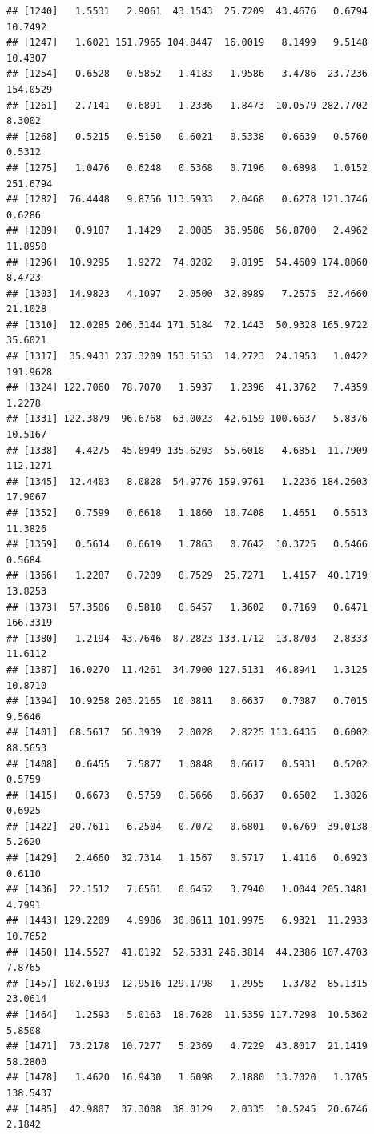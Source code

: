 \documentclass{article}\usepackage[]{graphicx}\usepackage[]{color}
\makeatletter
\newenvironment{kframe}{%
 \def\at@end@of@kframe{}%
 \ifinner\ifhmode%
  \def\at@end@of@kframe{\end{minipage}}%
  \begin{minipage}{\columnwidth}%
 \fi\fi%
 \def\FrameCommand##1{\hskip\@totalleftmargin \hskip-\fboxsep
 \colorbox{shadecolor}{##1}\hskip-\fboxsep
     \hskip-\linewidth \hskip-\@totalleftmargin \hskip\columnwidth}%
 \MakeFramed {\advance\hsize-\width
   \@totalleftmargin\z@ \linewidth\hsize
   \@setminipage}}%
 {\par\unskip\endMakeFramed%
 \at@end@of@kframe}
\newenvironment{knitrout}{}{} %
\makeatother
\begin{document}
\begin{knitrout}
\begin{kframe}
\begin{verbatim}
## [1240]   1.5531   2.9061  43.1543  25.7209  43.4676   0.6794  10.7492
## [1247]   1.6021 151.7965 104.8447  16.0019   8.1499   9.5148  10.4307
## [1254]   0.6528   0.5852   1.4183   1.9586   3.4786  23.7236 154.0529
## [1261]   2.7141   0.6891   1.2336   1.8473  10.0579 282.7702   8.3002
## [1268]   0.5215   0.5150   0.6021   0.5338   0.6639   0.5760   0.5312
## [1275]   1.0476   0.6248   0.5368   0.7196   0.6898   1.0152 251.6794
## [1282]  76.4448   9.8756 113.5933   2.0468   0.6278 121.3746   0.6286
## [1289]   0.9187   1.1429   2.0085  36.9586  56.8700   2.4962  11.8958
## [1296]  10.9295   1.9272  74.0282   9.8195  54.4609 174.8060   8.4723
## [1303]  14.9823   4.1097   2.0500  32.8989   7.2575  32.4660  21.1028
## [1310]  12.0285 206.3144 171.5184  72.1443  50.9328 165.9722  35.6021
## [1317]  35.9431 237.3209 153.5153  14.2723  24.1953   1.0422 191.9628
## [1324] 122.7060  78.7070   1.5937   1.2396  41.3762   7.4359   1.2278
## [1331] 122.3879  96.6768  63.0023  42.6159 100.6637   5.8376  10.5167
## [1338]   4.4275  45.8949 135.6203  55.6018   4.6851  11.7909 112.1271
## [1345]  12.4403   8.0828  54.9776 159.9761   1.2236 184.2603  17.9067
## [1352]   0.7599   0.6618   1.1860  10.7408   1.4651   0.5513  11.3826
## [1359]   0.5614   0.6619   1.7863   0.7642  10.3725   0.5466   0.5684
## [1366]   1.2287   0.7209   0.7529  25.7271   1.4157  40.1719  13.8253
## [1373]  57.3506   0.5818   0.6457   1.3602   0.7169   0.6471 166.3319
## [1380]   1.2194  43.7646  87.2823 133.1712  13.8703   2.8333  11.6112
## [1387]  16.0270  11.4261  34.7900 127.5131  46.8941   1.3125  10.8710
## [1394]  10.9258 203.2165  10.0811   0.6637   0.7087   0.7015   9.5646
## [1401]  68.5617  56.3939   2.0028   2.8225 113.6435   0.6002  88.5653
## [1408]   0.6455   7.5877   1.0848   0.6617   0.5931   0.5202   0.5759
## [1415]   0.6673   0.5759   0.5666   0.6637   0.6502   1.3826   0.6925
## [1422]  20.7611   6.2504   0.7072   0.6801   0.6769  39.0138   5.2620
## [1429]   2.4660  32.7314   1.1567   0.5717   1.4116   0.6923   0.6110
## [1436]  22.1512   7.6561   0.6452   3.7940   1.0044 205.3481   4.7991
## [1443] 129.2209   4.9986  30.8611 101.9975   6.9321  11.2933  10.7652
## [1450] 114.5527  41.0192  52.5331 246.3814  44.2386 107.4703   7.8765
## [1457] 102.6193  12.9516 129.1798   1.2955   1.3782  85.1315  23.0614
## [1464]   1.2593   5.0163  18.7628  11.5359 117.7298  10.5362   5.8508
## [1471]  73.2178  10.7277   5.2369   4.7229  43.8017  21.1419  58.2800
## [1478]   1.4620  16.9430   1.6098   2.1880  13.7020   1.3705 138.5437
## [1485]  42.9807  37.3008  38.0129   2.0335  10.5245  20.6746   2.1842

\end{verbatim}
\end{kframe}
\end{knitrout}
\end{document}
